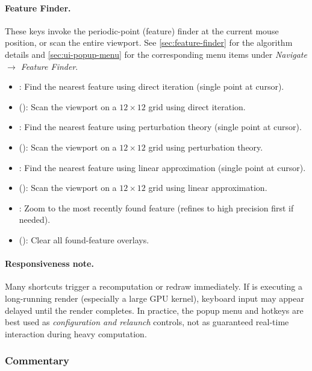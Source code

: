 \paragraph{Feature Finder.}
These keys invoke the periodic-point (feature) finder at the current mouse
position, or scan the entire viewport.  See \cref{sec:feature-finder}
for the algorithm details and \cref{sec:ui-popup-menu} for the
corresponding menu items under \emph{Navigate $\to$ Feature Finder}.
\begin{itemize}
  \item {}: Find the nearest feature using direct iteration (single point at cursor).
  \item {} (): Scan the viewport on a $12\times12$ grid using direct iteration.
  \item {}: Find the nearest feature using perturbation theory (single point at cursor).
  \item {} (): Scan the viewport on a $12\times12$ grid using perturbation theory.
  \item \code{,}: Find the nearest feature using linear approximation (single point at cursor).
  \item \code{<} (): Scan the viewport on a $12\times12$ grid using linear approximation.
  \item {}: Zoom to the most recently found feature (refines to high precision first if needed).
  \item \code{>} (): Clear all found-feature overlays.
\end{itemize}

\paragraph{Responsiveness note.}
Many shortcuts trigger a recomputation or redraw immediately.  If \FractalShark{}
is executing a long-running render (especially a large GPU kernel), keyboard
input may appear delayed until the render completes.  In practice, the popup
menu and hotkeys are best used as \emph{configuration and relaunch} controls,
not as guaranteed real-time interaction during heavy computation.

\subsubsection{Commentary}

